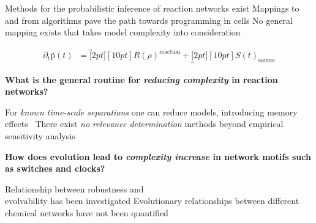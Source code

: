 \documentclass[a0,portrait]{a0poster}
\begin{document}
\begin{itemize}[leftmargin=5cm]
	\up Methods for the probabilistic inference of reaction networks exist \cite{Galagali2016BayesianNetworks}
	\up Mappings to and from algorithms pave the path towards programming in cells \cite{Dalchau2018ComputingClocks}
	\down No general mapping exists that takes model complexity into consideration
\end{itemize}

\begin{align*}
	\partial_t\bar{\mathrm{p}}(t)\;\;=
	\overbracket[2pt][10pt]{R(\rho)}^{\text{reaction}}+
	\underbracket[2pt][10pt]{S(t)}_{\text{source}}
\end{align*}


\begin{multicols}{2}

\begin{tcolorbox}[boxrule=2pt,arc=3.4pt,boxsep=2mm]
	\begin{center}
		\textbf{
		What is the general routine for \textit{reducing complexity} in reaction networks?}
	\end{center}
\end{tcolorbox}

\begin{itemize}[leftmargin=5cm]
	\up For \textit{known time-scale separations} one can reduce models, introducing memory effects~\cite{Phillies2000ProjectionFormalism}
	\down There exist \textit{no relevance determination} methods beyond
	empirical sensitivity analysis~\cite{Cardelli2016NoiseSwitches}
\end{itemize}

\vfill
\columnbreak

\begin{tcolorbox}[boxrule=2pt,arc=3.4pt,boxsep=2mm]
	\begin{center}
		\textbf{
		How does evolution lead to \textit{complexity increase} in network motifs such as switches and clocks?}
	\end{center}
\end{tcolorbox}

\begin{itemize}[leftmargin=5cm]
	\up Relationship between robustness and \\evolvability has been investigated \cite{Daniels2008SloppinessBiology}
	\down Evolutionary relationships between different chemical networks have not been quantified
\end{itemize}

\vfill
\end{multicols}
\vspace{1cm}
\end{document}
